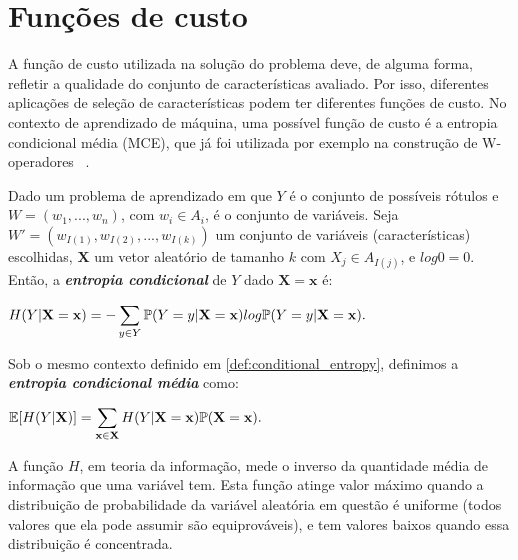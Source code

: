 \section{Funções de custo}
\label{fund_concept:mce} A função de custo utilizada na 
solução do problema deve, de alguma forma, refletir a qualidade do 
conjunto de características avaliado. Por isso,
diferentes aplicações de seleção de características
podem ter diferentes funções de custo. No contexto de aprendizado de 
máquina, uma possível função de custo é a entropia condicional média
(MCE), que já foi utilizada por exemplo na construção de W-operadores
~\cite{MJCJB06}.

\begin{mydefinition}\label{def:conditional_entropy}
Dado um problema de aprendizado em que $Y$ é o conjunto de possíveis
rótulos e $W = (w_1, ..., w_n)$, com $w_i \in A_i$, é o conjunto de
variáveis. Seja $W' = (w_{I(1)}, w_{I(2)}, ..., w_{I(k)})$ um conjunto 
de variáveis (características) escolhidas, $\mathbf{X}$ um vetor 
aleatório de tamanho $k$ com ${X_j} \in A_{I(j)}$, e $log0 = 0$. Então,
a {\bf \em entropia condicional} de $Y$ dado $\mathbf{X} = \mathbf x$ é:

\begin{center}
$
\begin{aligned}
H (Y | \mathbf{X = x}) = - 
\sum_{y \in Y} \mathbb{P} (Y = y | \mathbf{X = x}) log \mathbb{P} (Y = y | \mathbf{X = x}).
\end{aligned}
$
\end{center}
\end{mydefinition}

\begin{mydefinition}
Sob o mesmo contexto definido em \ref{def:conditional_entropy}, 
definimos a {\bf \em entropia condicional média} como:
\begin{center}
$
\begin{aligned}
    \mathbb{E}[H (Y | \mathbf{X})] = 
    \sum_{\mathbf{x} \in \mathbf{X}} H (Y | \mathbf{X = x}) \mathbb{P} (\mathbf{X = x}).
\end{aligned}
$
\end{center}
\end{mydefinition}


A função $H$, em teoria da informação, mede o inverso da quantidade 
média de informação que uma variável tem. Esta função atinge valor 
máximo quando a distribuição de probabilidade da variável aleatória em
questão é uniforme (todos valores que ela pode assumir são 
equiprováveis), e tem valores baixos quando essa distribuição é 
concentrada. 

